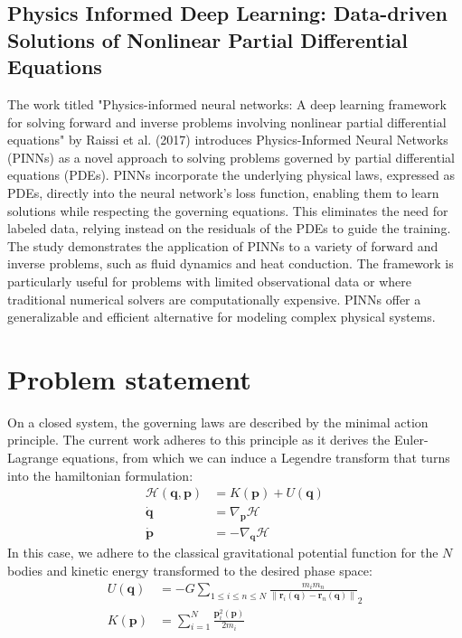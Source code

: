 \documentclass[draft]{agujournal2019}
\newcommand{\norm}[1]{\left\lVert#1\right\rVert}
\begin{document}
\subsection{Physics Informed Deep Learning: Data-driven Solutions of Nonlinear Partial Differential Equations}
The work titled "Physics-informed neural networks: A deep learning framework for solving forward and inverse problems involving nonlinear partial differential equations" by Raissi et al. (2017) introduces Physics-Informed Neural Networks (PINNs) as a novel approach to solving problems governed by partial differential equations (PDEs). PINNs incorporate the underlying physical laws, expressed as PDEs, directly into the neural network's loss function, enabling them to learn solutions while respecting the governing equations. This eliminates the need for labeled data, relying instead on the residuals of the PDEs to guide the training. The study demonstrates the application of PINNs to a variety of forward and inverse problems, such as fluid dynamics and heat conduction. The framework is particularly useful for problems with limited observational data or where traditional numerical solvers are computationally expensive. PINNs offer a generalizable and efficient alternative for modeling complex physical systems.

\section{Problem statement}
On a closed system, the governing laws are described by the minimal action principle. The current work adheres to this principle as it derives the Euler-Lagrange equations, from which we can induce a Legendre transform that turns into the hamiltonian formulation:
\begin{align}
    \mathcal{H}\left(\mathbf{q}, \mathbf{p}\right) &= K\left(\mathbf{p}\right)+ U\left(\mathbf{q}\right) \\
    \dot{\mathbf{q}} &= \nabla_\mathbf{p} \mathcal{H} \\
    \dot{\mathbf{p}} &= - \nabla_\mathbf{q} \mathcal{H}
\end{align}
In this case, we adhere to the classical gravitational potential function for the $N$ bodies and kinetic energy transformed to the desired phase space:
\begin{align*}
    U(\mathbf{q}) &= - G \sum_{1 \leq i \leq n \leq N} \frac{m_i m_n}{\norm{\mathbf{r}_i\left(\mathbf{q}\right) - \mathbf{r}_n\left(\mathbf{q}\right)}}_2 \\
    K(\mathbf{p}) &= \sum_{i = 1}^{N} \frac{\mathbf{p}_i^2\left(\mathbf{p}\right)}{2 m_i}
\end{align*}
\end{document}
